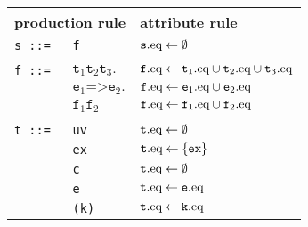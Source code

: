\begin{figure}
\begin{tabular}{lll}
\hline
\multicolumn{2}{l}{production rule} & attribute rule\\
  \hline
\texttt{s ::=}&\texttt{f}& $\texttt{s}.\text{eq} \leftarrow \emptyset$\\
       &&\\
\texttt{f ::= } &  $ \texttt{t}_1 \texttt{t}_2 \texttt{t}_3.$&   $ \texttt{f}.\text{eq} \leftarrow \texttt{t}_1.\text{eq}\cup \texttt{t}_2.\text{eq}\cup \texttt{t}_3.\text{eq}$ \\
    &  $\texttt{e}_1 \texttt{=>}  \texttt{e}_2.$& $\texttt{f}.\text{eq} \leftarrow \texttt{e}_1.\text{eq}\cup \texttt{e}_2.\text{eq}$ \\
    & $ \texttt{f}_1 \texttt{f}_2$ &                $\texttt{f}.\text{eq} \leftarrow \texttt{f}_1.\text{eq}\cup \texttt{f}_2.\text{eq}$ \\
&&\\
\texttt{t ::=}& \texttt{uv}\hspace{0.07\textwidth} &                $\texttt{t}.\text{eq} \leftarrow\emptyset$\\
            & \texttt{ex} &               $\texttt{t}.\text{eq} \leftarrow \{\texttt{ex}\}$\\
      & \texttt{c} &               $\texttt{t}.\text{eq} \leftarrow\emptyset$\\
      & \texttt{e} &                $\texttt{t}.\text{eq} \leftarrow\texttt{e}.\text{eq} $\\
      & \texttt{(k)}& $\texttt{t}.\text{eq} \leftarrow\texttt{k}.\text{eq}$\\

\end{tabular}
\end{figure}
